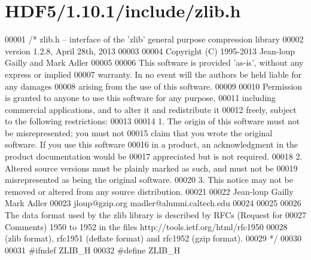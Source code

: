 \hypertarget{_h_d_f5_21_810_81_2include_2zlib_8h_source}{}\section{H\+D\+F5/1.10.1/include/zlib.h}
\label{_h_d_f5_21_810_81_2include_2zlib_8h_source}

\begin{DoxyCode}
00001 \textcolor{comment}{/* zlib.h -- interface of the 'zlib' general purpose compression library}
00002 \textcolor{comment}{  version 1.2.8, April 28th, 2013}
00003 \textcolor{comment}{}
00004 \textcolor{comment}{  Copyright (C) 1995-2013 Jean-loup Gailly and Mark Adler}
00005 \textcolor{comment}{}
00006 \textcolor{comment}{  This software is provided 'as-is', without any express or implied}
00007 \textcolor{comment}{  warranty.  In no event will the authors be held liable for any damages}
00008 \textcolor{comment}{  arising from the use of this software.}
00009 \textcolor{comment}{}
00010 \textcolor{comment}{  Permission is granted to anyone to use this software for any purpose,}
00011 \textcolor{comment}{  including commercial applications, and to alter it and redistribute it}
00012 \textcolor{comment}{  freely, subject to the following restrictions:}
00013 \textcolor{comment}{}
00014 \textcolor{comment}{  1. The origin of this software must not be misrepresented; you must not}
00015 \textcolor{comment}{     claim that you wrote the original software. If you use this software}
00016 \textcolor{comment}{     in a product, an acknowledgment in the product documentation would be}
00017 \textcolor{comment}{     appreciated but is not required.}
00018 \textcolor{comment}{  2. Altered source versions must be plainly marked as such, and must not be}
00019 \textcolor{comment}{     misrepresented as being the original software.}
00020 \textcolor{comment}{  3. This notice may not be removed or altered from any source distribution.}
00021 \textcolor{comment}{}
00022 \textcolor{comment}{  Jean-loup Gailly        Mark Adler}
00023 \textcolor{comment}{  jloup@gzip.org          madler@alumni.caltech.edu}
00024 \textcolor{comment}{}
00025 \textcolor{comment}{}
00026 \textcolor{comment}{  The data format used by the zlib library is described by RFCs (Request for}
00027 \textcolor{comment}{  Comments) 1950 to 1952 in the files http://tools.ietf.org/html/rfc1950}
00028 \textcolor{comment}{  (zlib format), rfc1951 (deflate format) and rfc1952 (gzip format).}
00029 \textcolor{comment}{*/}
00030 
00031 \textcolor{preprocessor}{#ifndef ZLIB\_H}
00032 \textcolor{preprocessor}{#define ZLIB\_H}

\end{DoxyCode}
